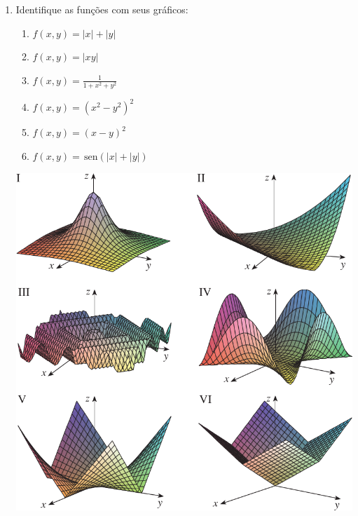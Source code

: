 \documentclass[a4paper,5pt]{amsbook}
\newcommand{\sen}{\,\mbox{sen}}
\newcommand{\ds}{\displaystyle}
\begin{document}
\begin{enumerate}

    \item Identifique as fun\c{c}\~oes com seus gr\'aficos:

    \begin{minipage}[r]{0.4\textwidth}
        \begin{enumerate}
            \setlength\itemsep{0.2cm}
            \item $f(x,y) = |x|+|y|$
            \item $f(x,y) = |xy|$
            \item $f(x,y) = \ds\frac{1}{1+x^2+y^2}$
            \item $f(x,y) = (x^2-y^2)^2$
            \item $f(x,y) = (x-y)^2$
            \item $f(x,y) = \sen(|x|+|y|)$
        \end{enumerate}
    \end{minipage}
    \hfill{}
    \begin{minipage}[l]{0.5\textwidth}
        \includegraphics[width=\textwidth]{lista-01-fig1.png}
    \end{minipage}


\end{enumerate}
\end{document}
